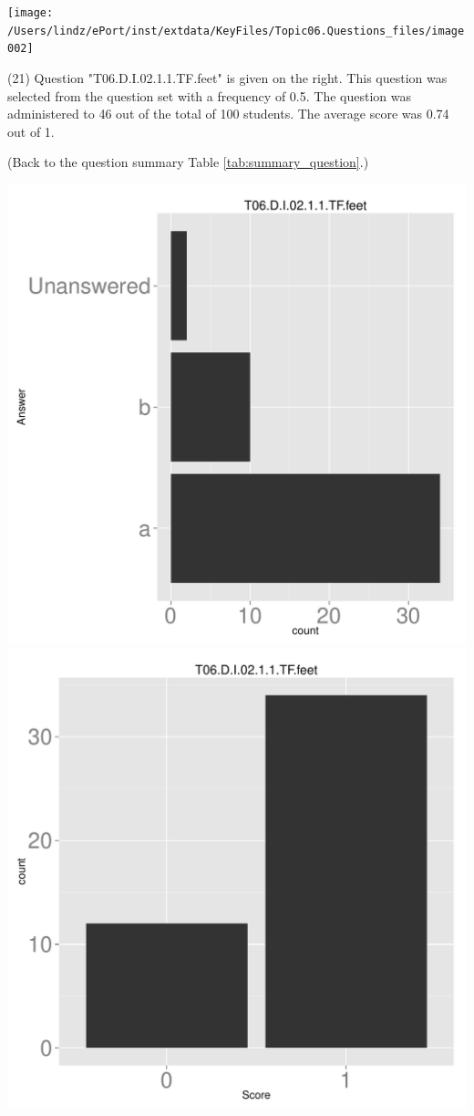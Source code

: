 \documentclass[12pt,nohyper]{tufte-handout}\usepackage[]{graphicx}\usepackage[]{color}
\begin{document}
\vspace{5cm}\begin{marginfigure}\texttt{[image: /Users/lindz/ePort/inst/extdata/KeyFiles/Topic06.Questions\_files/image002]}\end{marginfigure}\vspace{-5cm} (21) Question "T06.D.I.02.1.1.TF.feet" is given on the right. This question was selected from the question set with a frequency of 0.5. The question was administered to 46 out of the total of 100 students. The average score was 0.74 out of 1.

 (Back to the question summary Table \ref{tab:summary_question}.)

\begin{center} \includegraphics[width=.45\linewidth]{Topic06_21_answer} \includegraphics[width=.45\linewidth]{Topic06_21_score} \end{center} 
\end{document}
